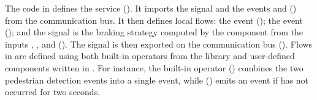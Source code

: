 The code in  defines the service 
().
It imports the signal  and the events  and 
() from the communication bus.
It then defines local flows:
the event  %
();
the event  %
();
and the signal  is the braking strategy computed by the component 
from the inputs , , and  ().
The signal  is then exported on the communication bus ().
%
Flows in \GRFRP are defined using both built-in operators from the \GReact library and
user-defined components written in \GRSync. For instance, the built-in operator
 () combines the two pedestrian detection events into a single
event, while  () emits an event if  has not
occurred for two seconds.

